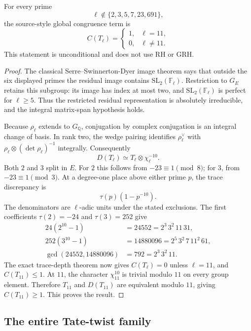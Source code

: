 \begin{proposition}
\label{prop:delta-global-term}
For every prime
\[
 \ell\notin\{2,3,5,7,23,691\},
\]
the source-style global congruence term is
\[
 C(T_\ell)=
 \begin{cases}
 1,&\ell=11,\\
 0,&\ell\ne11.
 \end{cases}
\]
This statement is unconditional and does not use RH or GRH.
\end{proposition}
\begin{proof}
The classical Serre--Swinnerton-Dyer image theorem says that outside the
six displayed primes the residual image contains
$\mathrm{SL}_2(\mathbb F_\ell)$.\cite{swinnerton,edixhoven}  Restriction to $G_E$ retains this
subgroup: its image has index at most two, and
$\mathrm{SL}_2(\mathbb F_\ell)$ is perfect for $\ell\geq5$.
Thus the restricted residual representation is absolutely irreducible,
and the integral matrix-span hypothesis holds.

Because $\rho_\ell$ extends to $G_{\mathbb Q}$, conjugation by complex
conjugation is an integral change of basis.  In rank two, the wedge
pairing identifies $\rho_\ell^\vee$ with
$\rho_\ell\otimes(\det\rho_\ell)^{-1}$ integrally.
Consequently
\[
 D(T_\ell)\simeq T_\ell\otimes\chi_\ell^{-10}.
\]
Both $2$ and $3$ split in $E$.  For $2$ this follows from
$-23\equiv1\pmod8$; for $3$, from $-23\equiv1\pmod3$.
At a degree-one place above either prime $p$, the trace discrepancy is
\[
 \tau(p)(1-p^{-10}).
\]
The denominators are $\ell$-adic units under the stated exclusions.
The first coefficients $\tau(2)=-24$ and $\tau(3)=252$ give
\[
 \begin{aligned}
 24(2^{10}-1)&=24552=2^3\,3^2\,11\,31,\\
 252(3^{10}-1)&=14880096=2^5\,3^2\,7\,11^2\,61,\\
 \gcd(24552,14880096)&=792=2^3\,3^2\,11.
 \end{aligned}
\]
The exact trace-depth theorem now gives $C(T_\ell)=0$ unless
$\ell=11$, and $C(T_{11})\leq1$.  At $11$, the character
$\chi_{11}^{10}$ is trivial modulo $11$ on every group element.
Therefore $T_{11}$ and $D(T_{11})$ are equivalent modulo $11$, giving
$C(T_{11})\geq1$.  This proves the result.
\end{proof}

\subsection{The entire Tate-twist family}

